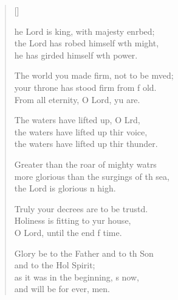 \settowidth{\versewidth}{more glorious than the surgings of the sea, *}
\begin{verse}[\versewidth]
  \begin{patverse}
he Lord is king, with majesty enrbed;\Flex\\
    the Lord has robed himself w\pointup{\i}th might,\Med\\
    he has girded himself w\pointup{\i}th power.

The world you made firm, not to be mved;\Flex\\
    your throne has stood firm from f old.\Med\\
    From all eternity, O Lord, yu are.

The waters have lifted up, O Lrd,\Flex\\
    the waters have lifted up thir voice,\Med\\
    the waters have lifted up thir thunder.

Greater than the roar of mighty watrs\Flex\\
    more glorious than the surgings of th sea,\Med\\
    the Lord is glorious n high.

Truly your decrees are to be trustd.\Flex\\
    Holiness is fitting to yur house,\Med\\
    O Lord, until the end f time.

Glory be to the Father and to th Son\Med\\
    and to the Hol Spirit;\\
as it was in the beginning, \pointup{\i}s now,\Med\\
    and will be for ever, men.
  \end{patverse}
\end{verse}
